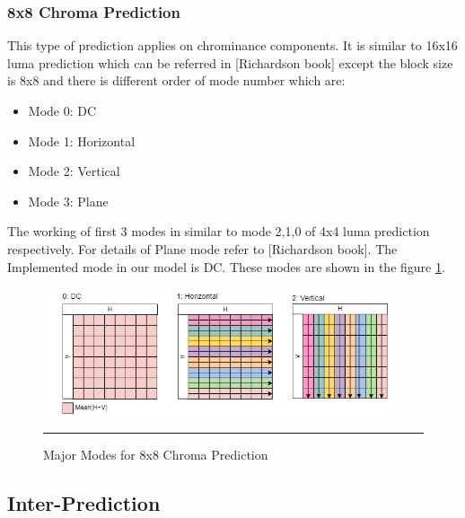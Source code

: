 \subsubsection{8x8 Chroma Prediction}
This type of prediction applies on chrominance components. It is similar to 16x16 luma prediction which can be referred in [Richardson book] except the block size is 8x8 and there is different order of mode number which are:

\begin{itemize}
	\item Mode 0: DC
	\item Mode 1: Horizontal
	\item Mode 2: Vertical
	\item Mode 3: Plane
\end{itemize}

The working of first 3 modes in similar to mode 2,1,0 of 4x4 luma prediction respectively. For details of Plane mode refer to [Richardson book]. The Implemented mode in our model is DC. These modes are shown in the figure \ref{fig:8x8modes}.

\begin{figure}[htbp]
	\centering
	\includegraphics[width = 4in]{./Figures/8x8modes.png}
	\rule{35em}{0.5pt}
	\caption{Major Modes for 8x8 Chroma Prediction}
	\label{fig:8x8modes}
\end{figure}

\subsection{Inter-Prediction}


